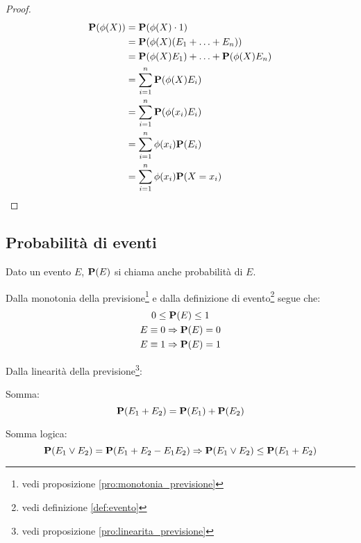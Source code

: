 \begin{proof}
  \begin{align*}
    \pr(\phi(X)) &= \pr(\phi(X) \cdot 1) \\
    &= \pr(\phi(X)(E_1 + \ldots + E_n)) \\
    &= \pr(\phi(X) E_1) + \ldots + \pr(\phi(X) E_n) \\
    &= \sum_{i=1}^{n} \pr(\phi(X) E_i) \\
    &= \sum_{i=1}^{n} \pr(\phi(x_i) E_i) \\ %
    &= \sum_{i=1}^{n} \phi(x_i) \pr(E_i) \\
    &= \sum_{i=1}^{n} \phi(x_i) \pr(X = x_i)
  \end{align*}
\end{proof}


\subsection{Probabilità di eventi} %
\begin{definition}[Probabilità]\label{def:probabilita}
  Dato un evento \( E \), \( \mathbf{P}(E) \) si chiama anche probabilità di \( E \).
\end{definition}

\begin{proposition}
  Dalla monotonia della previsione\footnote{vedi proposizione \ref{pro:monotonia_previsione}} e dalla definizione di evento\footnote{vedi definizione \ref{def:evento}} segue che:
  \begin{gather*}
    0 \le \mathbf{P}(E) \le 1 \\
    E \equiv 0 \Rightarrow \mathbf{P}(E) = 0 \\
    E \equiv 1 \Rightarrow \mathbf{P}(E) = 1
  \end{gather*}
\end{proposition}

\begin{proposition}
  Dalla linearità della previsione\footnote{vedi proposizione \ref{pro:linearita_previsione}}:

  Somma:
  \[ \mathbf{P}(E_1 + E_2) = \mathbf{P}(E_1) + \mathbf{P}(E_2) \]

  Somma logica:
  \[ \mathbf{P}(E_1 \vee E_2) = \mathbf{P}(E_1 + E_2 - E_1 E_2) \Rightarrow \mathbf{P}(E_1 \vee E_2) \le \mathbf{P}(E_1 + E_2) \]
\end{proposition}

